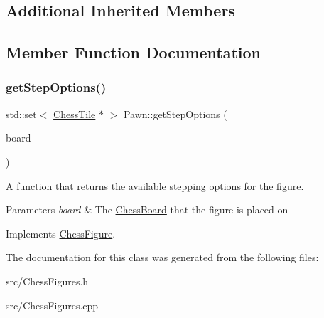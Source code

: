 \subsection*{Additional Inherited Members}


\subsection{Member Function Documentation}
\mbox{\label{classPawn_aa05272b9dcf50914ca51c5be1fe2d014}} 
\subsubsection{\texorpdfstring{get\+Step\+Options()}{getStepOptions()}}
{\footnotesize\ttfamily std\+::set$<$ \mbox{\hyperlink{classChessTile}{Chess\+Tile}} $\ast$ $>$ Pawn\+::get\+Step\+Options (\begin{DoxyParamCaption}\item[{\mbox{\hyperlink{classChessBoard}{Chess\+Board}} \&}]{board }\end{DoxyParamCaption})\hspace{0.3cm}{\ttfamily [virtual]}}



A function that returns the available stepping options for the figure. 


\begin{DoxyParams}{Parameters}
{\em board} & The \mbox{\hyperlink{classChessBoard}{Chess\+Board}} that the figure is placed on \\
\hline
\end{DoxyParams}


Implements \mbox{\hyperlink{classChessFigure_ae78d52e35c4ea926f492d211c69758bd}{Chess\+Figure}}.



The documentation for this class was generated from the following files\+:\begin{DoxyCompactItemize}
\item 
src/Chess\+Figures.\+h\item 
src/Chess\+Figures.\+cpp\end{DoxyCompactItemize}
